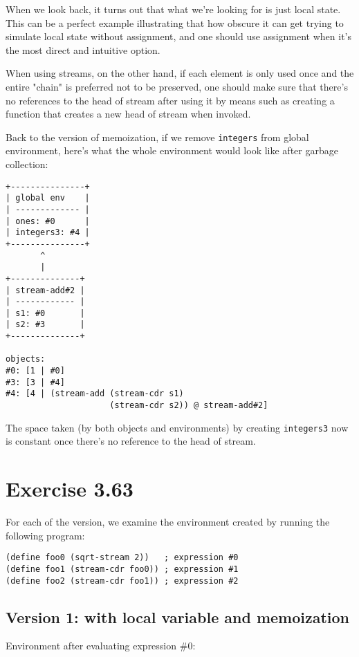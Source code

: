\documentclass[../main.tex]{subfiles}
\begin{document}
When we look back, it turns out that what we're looking for is just local state. This can be a perfect example illustrating that how obscure it can get trying to simulate local state without assignment, and one should use assignment when it's the most direct and intuitive option.

When using streams, on the other hand, if each element is only used once and the entire "chain" is preferred not to be preserved, one should make sure that there's no references to the head of stream after using it by means such as creating a function that creates a new head of stream when invoked.

Back to the version of memoization, if we remove \lstinline{integers} from global environment, here's what the whole environment would look like after garbage collection:

\begin{lstlisting}
+---------------+
| global env    |
| ------------- |
| ones: #0      |
| integers3: #4 |
+---------------+
       ^
       |
+--------------+
| stream-add#2 |
| ------------ |
| s1: #0       |
| s2: #3       |
+--------------+

objects:
#0: [1 | #0]
#3: [3 | #4]
#4: [4 | (stream-add (stream-cdr s1)
                     (stream-cdr s2)) @ stream-add#2]
\end{lstlisting}

The space taken (by both objects and environments) by creating \lstinline{integers3} now is constant once there's no reference to the head of stream.

\section{Exercise 3.63}

For each of the version, we examine the environment created by running the following program:

\begin{lstlisting}
(define foo0 (sqrt-stream 2))   ; expression #0
(define foo1 (stream-cdr foo0)) ; expression #1
(define foo2 (stream-cdr foo1)) ; expression #2
\end{lstlisting}

\subsection{Version 1: with local variable and memoization}

Environment after evaluating expression $\#0$:
\end{document}
